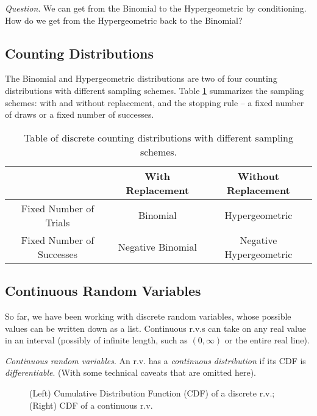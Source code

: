 \documentclass[11pt,a4paper]{article}
\begin{document}
\emph{Question}. 
We can get from the Binomial to the Hypergeometric by conditioning. 
How do we get from the Hypergeometric back to the Binomial?

\subsection{Counting Distributions}

The Binomial and Hypergeometric distributions 
are two of four counting distributions with different sampling schemes. 
Table \ref{tab:counting} summarizes the sampling schemes: 
with and without replacement, 
and the stopping rule --
a fixed number of draws or a fixed number of successes.

\begin{table}[h!]
\centering
\begin{tabular}{| c | c | c |}
\hline
& With Replacement & Without Replacement \\\hline
Fixed Number of Trials & Binomial & Hypergeometric \\\hline
Fixed Number of Successes & Negative Binomial & Negative Hypergeometric \\\hline
\end{tabular}
\caption{%
Table of discrete counting distributions with different sampling schemes.
}
\label{tab:counting}
\end{table}

\subsection{Continuous Random Variables}

So far, 
we have been working with discrete random variables, 
whose possible values can be written down as a list. 
Continuous r.v.s can take on any real value in an interval (possibly of infinite length, 
such as \((0,\infty)\) or the entire real line).

\emph{Continuous random variables}. 
An r.v. has a \emph{continuous distribution} if its CDF is \emph{differentiable}. 
(With some technical caveats that are omitted here).

\begin{figure}[h!]
\centering
\begin{minipage}{.5\textwidth}
  \centering
  
\end{minipage}%
\begin{minipage}{.5\textwidth}
  \centering
  
\end{minipage}
\caption{%
(Left) Cumulative Distribution Function (CDF) of a discrete r.v.; 
(Right) CDF of a continuous r.v.}
\end{figure}
\end{document}
